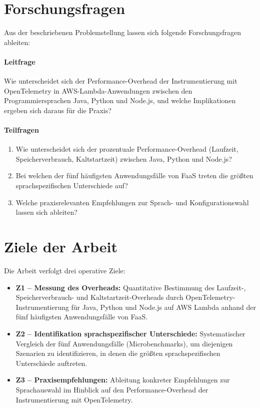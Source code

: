 \section{Forschungsfragen}
\label{sec:intro:fragen}

Aus der beschriebenen Problemstellung lassen sich folgende Forschungsfragen ableiten:

\paragraph{Leitfrage}
Wie unterscheidet sich der Performance-Overhead der Instrumentierung mit OpenTelemetry in AWS-Lambda-Anwendungen zwischen den Programmiersprachen Java, Python und Node.js, und welche Implikationen ergeben sich daraus für die Praxis?

\paragraph{Teilfragen}
\begin{enumerate}
    \item Wie unterscheidet sich der prozentuale Performance-Overhead (Laufzeit, Speicherverbrauch, Kaltstartzeit) zwischen Java, Python und Node.js?
    \item Bei welchen der fünf häufigsten Anwendungsfälle von \ac{FaaS} treten die größten sprachspezifischen Unterschiede auf?
    \item Welche praxisrelevanten Empfehlungen zur Sprach- und Konfigurationswahl lassen sich ableiten?
\end{enumerate}

%
\section{Ziele der Arbeit}
\label{sec:intro:ziele}

Die Arbeit verfolgt drei operative Ziele:

\begin{itemize}
    \item \textbf{Z1 – Messung des Overheads:} Quantitative Bestimmung des Laufzeit-, Speicherverbrauch- und Kaltstartzeit-Overheads durch OpenTelemetry-Instrumentierung für Java, Python und Node.js auf AWS Lambda anhand der fünf häufigsten Anwendungsfälle von FaaS.
    
    \item \textbf{Z2 – Identifikation sprachspezifischer Unterschiede:} Systematischer Vergleich der fünf Anwendungsfälle (Microbenchmarks), 
    um diejenigen Szenarien zu identifizieren, in denen die größten sprachspezifischen Unterschiede auftreten.
    
    \item \textbf{Z3 – Praxisempfehlungen:} Ableitung konkreter Empfehlungen zur Sprachauswahl im Hinblick auf den Performance-Overhead der Instrumentierung mit OpenTelemetry.
\end{itemize}

